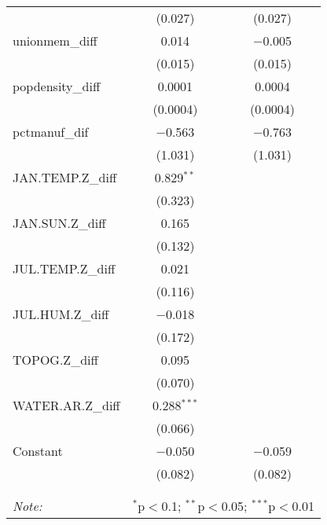 \begin{table}[!htbp]
\begin{tabular}{@{\extracolsep{5pt}}lcc}
  & (0.027) & (0.027) \\ 
  unionmem\_diff & 0.014 & $-$0.005 \\ 
  & (0.015) & (0.015) \\ 
  popdensity\_diff & 0.0001 & 0.0004 \\ 
  & (0.0004) & (0.0004) \\ 
  pctmanuf\_dif & $-$0.563 & $-$0.763 \\ 
  & (1.031) & (1.031) \\ 
  JAN.TEMP.Z\_diff & 0.829$^{**}$ &  \\ 
  & (0.323) &  \\ 
  JAN.SUN.Z\_diff & 0.165 &  \\ 
  & (0.132) &  \\ 
  JUL.TEMP.Z\_diff & 0.021 &  \\ 
  & (0.116) &  \\ 
  JUL.HUM.Z\_diff & $-$0.018 &  \\ 
  & (0.172) &  \\ 
  TOPOG.Z\_diff & 0.095 &  \\ 
  & (0.070) &  \\ 
  WATER.AR.Z\_diff & 0.288$^{***}$ &  \\ 
  & (0.066) &  \\ 
  Constant & $-$0.050 & $-$0.059 \\ 
  & (0.082) & (0.082) \\ 
 \hline \\[-1.8ex] 
\hline 
\hline \\[-1.8ex] 
\textit{Note:}  & \multicolumn{2}{r}{$^{*}$p$<$0.1; $^{**}$p$<$0.05; $^{***}$p$<$0.01} \\ 
\end{tabular} 
\end{table} 
